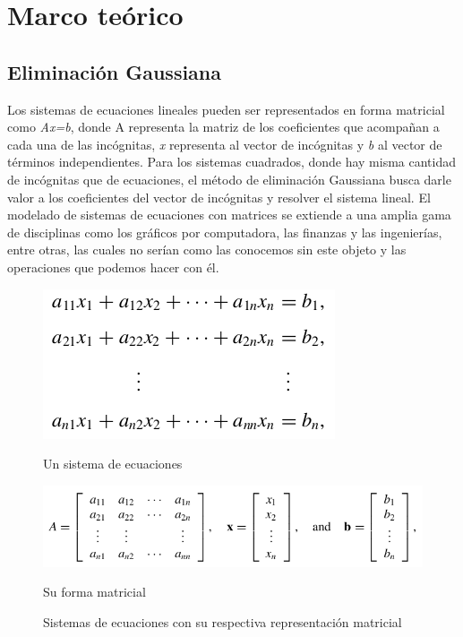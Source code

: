 \section{Marco teórico}

\subsection{Eliminación Gaussiana}
\label{sec:gaussiana}

Los sistemas de ecuaciones lineales pueden ser representados en forma matricial como \textit{Ax=b}, donde A representa la matriz de los coeficientes que acompañan a cada una de las incógnitas, \textit{x} representa al vector de incógnitas y \textit{b} al vector de términos independientes. Para los sistemas cuadrados, donde hay misma cantidad de incógnitas que de ecuaciones, el método de eliminación Gaussiana busca darle valor a los coeficientes del vector de incógnitas y resolver el sistema lineal. El modelado de sistemas de ecuaciones con matrices se extiende a una amplia gama de disciplinas como los gráficos por computadora, las finanzas y las ingenierías, entre otras, las cuales no serían como las conocemos sin este objeto y las operaciones que podemos hacer con él. 

\begin{figure}[h]
    \centering
    \begin{minipage}{0.3\linewidth}
        \includegraphics[width=\linewidth]{img/sistema_de_ecuaciones.png}
        \caption{Un sistema de ecuaciones}
    \end{minipage}
  \begin{minipage}{0.45\linewidth}
      \includegraphics[width=\linewidth]{img/combinacion_lineal.png}
      \caption{Su forma matricial}
  \end{minipage}
  \caption{Sistemas de ecuaciones con su respectiva representación matricial}
\end{figure}

